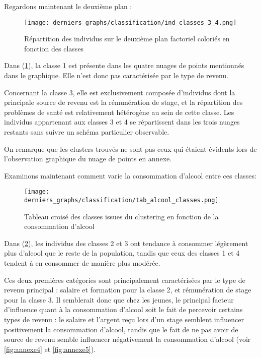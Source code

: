 \documentclass{article}
\begin{document}
Regardons maintenant le deuxième plan :

\begin{figure}[H]
  \centering
  \texttt{[image: derniers\_graphs/classification/ind\_classes\_3\_4.png]} 
  \caption{Répartition des individus sur le deuxième plan factoriel coloriés en fonction des classes}
  \label{fig:class2}
\end{figure}

Dans (\ref{fig:class2}), la classe 1 est présente dans les quatre nuages de points mentionnés dans le graphique. Elle n'est donc pas caractérisée par le type de revenu.

Concernant la classe 3, elle est exclusivement composée d'individus dont la principale source de revenu est la rémunération de stage, et la répartition des problèmes de santé est relativement hétérogène au sein de cette classe. Les individus appartenant aux classes 3 et 4 se répartissent dans les trois nuages restants sans suivre un schéma particulier observable.

On remarque que les clusters trouvés ne sont pas ceux qui étaient évidents lors de l'observation graphique du nuage de points en annexe.

Examinons maintenant comment varie la consommation d'alcool entre ces classes:
\begin{figure}[H]
  \centering
  \texttt{[image: derniers\_graphs/classification/tab\_alcool\_classes.png]} 
  \caption{Tableau croisé des classes issues du clustering en fonction de la consommation d'alcool}
  \label{fig:class3}
\end{figure}

Dans (\ref{fig:class3}), les individus des classes 2 et 3 ont tendance à consommer légèrement plus d'alcool que le reste de la population, tandis que ceux des classes 1 et 4 tendent à en consommer de manière plus modérée.

Ces deux premières catégories sont principalement caractérisées par le type de revenu principal : salaire et formation pour la classe 2, et rémunération de stage pour la classe 3. Il semblerait donc que chez les jeunes, le principal facteur d'influence quant à la consommation d'alcool soit le fait de percevoir certains types de revenu : le salaire et l'argent reçu lors d'un stage semblent influencer positivement la consommation d'alcool, tandis que le fait de ne pas avoir de source de revenu semble influencer négativement la consommation d'alcool (voir \ref{fig:annexe4} et \ref{fig:annexe5}).
\end{document}
